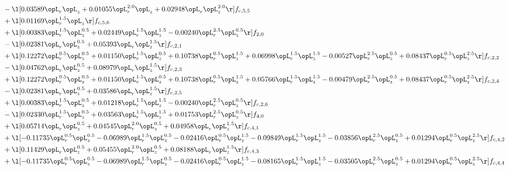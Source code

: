 \begin{alignat}{2}
& - \l[  0.03589 \opL_r \opL_z +  0.01055 \opL_r^{2.0} \opL_z +  0.02948 \opL_r \opL_z^{2.0}  \r] f_{c,5,5} \nonumber \\ 
& + \l[  0.01169 \opL_r^{1.5} \opL_z  \r] f_{c,5,6} \nonumber \\ 
& + \l[  0.00383 \opL_r^{1.5} \opL_z^{0.5} +  0.02449 \opL_r^{1.5} \opL_z^{1.5}   -0.00240 \opL_r^{2.5} \opL_z^{0.5}  \r] f_{2,0} \nonumber \\ 
& - \l[  0.02381 \opL_r \opL_z^{0.5} +  0.05393 \opL_r \opL_z^{1.5}  \r] f_{c,2,1} \nonumber \\ 
& + \l[  0.12272 \opL_r^{0.5} \opL_z^{0.5} +  0.01150 \opL_r^{1.5} \opL_z^{0.5} +  0.10738 \opL_r^{0.5} \opL_z^{1.5} +  0.06998 \opL_r^{1.5} \opL_z^{1.5}   -0.00527 \opL_r^{2.5} \opL_z^{0.5} +  0.08437 \opL_r^{0.5} \opL_z^{2.5}  \r] f_{c,2,2} \nonumber \\ 
& - \l[  0.04762 \opL_r \opL_z^{0.5} +  0.08979 \opL_r \opL_z^{1.5}  \r] f_{c,2,3} \nonumber \\ 
& + \l[  0.12272 \opL_r^{0.5} \opL_z^{0.5} +  0.01150 \opL_r^{1.5} \opL_z^{0.5} +  0.10738 \opL_r^{0.5} \opL_z^{1.5} +  0.05766 \opL_r^{1.5} \opL_z^{1.5}   -0.00479 \opL_r^{2.5} \opL_z^{0.5} +  0.08437 \opL_r^{0.5} \opL_z^{2.5}  \r] f_{c,2,4} \nonumber \\ 
& - \l[  0.02381 \opL_r \opL_z^{0.5} +  0.03586 \opL_r \opL_z^{1.5}  \r] f_{c,2,5} \nonumber \\ 
& + \l[  0.00383 \opL_r^{1.5} \opL_z^{0.5} +  0.01218 \opL_r^{1.5} \opL_z^{1.5}   -0.00240 \opL_r^{2.5} \opL_z^{0.5}  \r] f_{c,2,6} \nonumber \\ 
& - \l[  0.02330 \opL_r^{1.5} \opL_z^{0.5} +  0.03563 \opL_r^{1.5} \opL_z^{1.5} +  0.01753 \opL_r^{2.5} \opL_z^{0.5}  \r] f_{4,0} \nonumber \\ 
& + \l[  0.05714 \opL_r \opL_z^{0.5} +  0.04545 \opL_r^{2.0} \opL_z^{0.5} +  0.04958 \opL_r \opL_z^{1.5}  \r] f_{c,4,1} \nonumber \\ 
& + \l[  -0.11735 \opL_r^{0.5} \opL_z^{0.5}   -0.06989 \opL_r^{1.5} \opL_z^{0.5}   -0.02416 \opL_r^{0.5} \opL_z^{1.5}   -0.09849 \opL_r^{1.5} \opL_z^{1.5}   -0.03856 \opL_r^{2.5} \opL_z^{0.5} +  0.01294 \opL_r^{0.5} \opL_z^{2.5}  \r] f_{c,4,2} \nonumber \\ 
& + \l[  0.11429 \opL_r \opL_z^{0.5} +  0.05455 \opL_r^{2.0} \opL_z^{0.5} +  0.08188 \opL_r \opL_z^{1.5}  \r] f_{c,4,3} \nonumber \\ 
& + \l[  -0.11735 \opL_r^{0.5} \opL_z^{0.5}   -0.06989 \opL_r^{1.5} \opL_z^{0.5}   -0.02416 \opL_r^{0.5} \opL_z^{1.5}   -0.08165 \opL_r^{1.5} \opL_z^{1.5}   -0.03505 \opL_r^{2.5} \opL_z^{0.5} +  0.01294 \opL_r^{0.5} \opL_z^{2.5}  \r] f_{c,4,4} \nonumber \\ 

\end{alignat}

